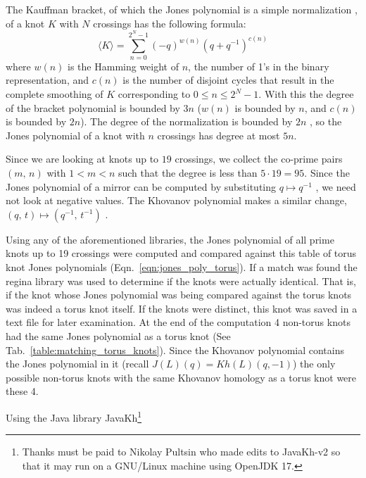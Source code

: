     The Kauffman bracket, of which the Jones polynomial is a simple
    normalization \cite{barnatan2002khovanov},
    of a knot $K$ with $N$ crossings has the following formula:
    \begin{equation}
        \langle{K}\rangle=\sum_{n=0}^{2^{N}-1}(-q)^{w(n)}(q+q^{-1})^{c(n)}
    \end{equation}
    where $w(n)$ is the Hamming weight of $n$, the number of 1's in the
    binary representation, and $c(n)$ is the number of disjoint cycles
    that result in the complete smoothing of $K$ corresponding to
    $0\leq{n}\leq{2}^{N}-1$. With this the degree of the bracket polynomial
    is bounded by $3n$ ($w(n)$ is bounded by $n$, and $c(n)$ is bounded
    by $2n$). The degree of the normalization is bounded by $2n$
    \cite{barnatan2002khovanov}, so the
    Jones polynomial of a knot with $n$ crossings has degree at most $5n$.
    \par\hfill\par
    Since we are looking at knots up to $19$ crossings, we collect the
    co-prime pairs $(m,\,n)$ with $1<m<n$ such that the degree
    is less than $5\cdot{19}=95$. Since the Jones polynomial of a mirror
    can be computed by substituting $q\mapsto{q}^{-1}$
    \cite{jonespolyjones}, we need not look at
    negative values. The Khovanov polynomial makes a similar change,
    $(q,\,t)\mapsto(q^{-1},\,t^{-1})$
    \cite{WATSON2017915}.
    \par\hfill\par
    Using any of the aforementioned libraries, the Jones polynomial of all
    prime knots up to 19 crossings were computed and compared against this
    table of torus knot Jones polynomials (Eqn.~\ref{eqn:jones_poly_torus}).
    If a match was found the regina library was used to determine if the
    knots were actually identical. That is, if the knot whose Jones
    polynomial was being compared against the torus knots was indeed a
    torus knot itself. If the knots were distinct, this knot was saved in a
    text file for later examination. At the end of the computation 4
    non-torus knots had the same Jones polynomial as a torus knot
    (See Tab.~\ref{table:matching_torus_knots}).
    Since the Khovanov polynomial contains the Jones polynomial in it
    (recall $J(L)(q)=Kh(L)(q,-1)$) the only possible non-torus knots with
    the same Khovanov homology as a torus knot were these 4.
    \par\hfill\par
    Using the Java library JavaKh\footnote{%
        Thanks must be paid to Nikolay Pultsin who made edits to
        JavaKh-v2 so that it may run on a GNU/Linux machine using
        OpenJDK 17.
    }
